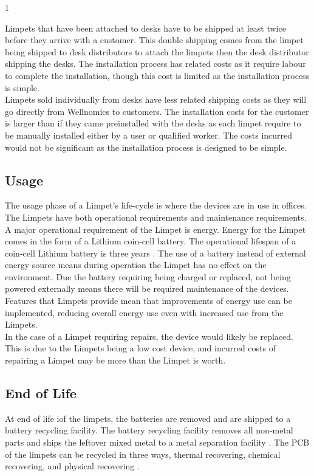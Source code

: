 1\documentclass{article}
\begin{document}
Limpets that have been attached to desks have to be shipped at least twice before they arrive with a customer. This double shipping comes from the limpet being shipped to desk distributors to attach the limpets then the desk distributor shipping the desks. The installation process has related costs as it require labour to complete the installation, though this cost is limited as the installation process is simple.\\

Limpets sold individually from desks have less related shipping costs as they will go directly from Wellnomics to customers. The installation costs for the customer is larger than if they came preinstalled with the desks as each limpet require to be manually installed either by a user or qualified worker. The costs incurred would not be significant as the installation process is designed to be simple.

\subsection{Usage}
The usage phase of a Limpet's life-cycle is where the devices are in use in offices. The Limpets have both operational requirements and maintenance requirements.\\

A major operational requirement of the Limpet is energy. Energy for the Limpet comes in the form of a Lithium coin-cell battery. The operational lifespan of a coin-cell Lithium battery is three years \cite{liioncoincell}. The use of a battery instead of external energy source means during operation the Limpet has no effect on the environment. Due the battery requiring being charged or replaced, not being powered externally means there will be required maintenance of the devices. Features that Limpets provide mean that improvements of energy use can be implemented, reducing overall energy use even with increased use from the Limpets.\\

In the case of a Limpet requiring repairs, the device would likely be replaced. This is due to the Limpets being a low cost device, and incurred costs of repairing a Limpet may be more than the Limpet is worth.\\

\subsection{End of Life}
At end of life iof the limpets, the batteries are removed and are shipped to a battery recycling facility. The battery recycling facility removes all non-metal parts and ships the leftover mixed metal to a metal separation facility \cite{batteryuni}. The PCB of the limpets can be recycled in three ways, thermal recovering, chemical recovering, and physical recovering \cite{candorInd}.\\
\end{document}
